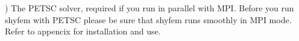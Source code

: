 \begin{itemize}






) The PETSC solver, required if you run in parallel with MPI. Before you run shyfem with PETSC please be sure that shyfem runs smoothly in MPI mode. Refer to appencix for installation and use.


 




\end{itemize}
